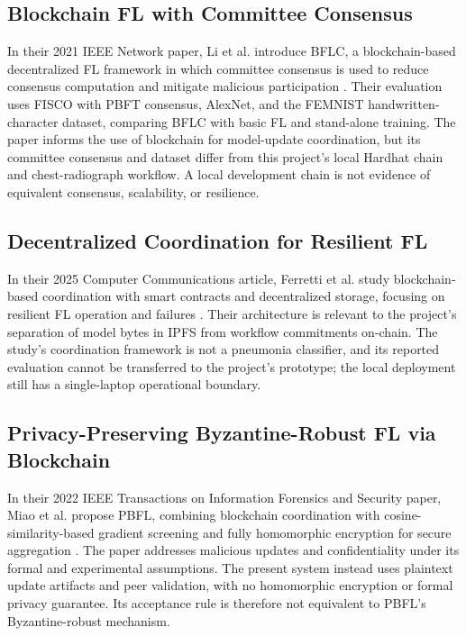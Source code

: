 \documentclass[12pt,a4paper]{report}
\begin{document}
\subsection{Blockchain FL with Committee Consensus}
In their 2021 IEEE Network paper, Li et al. introduce BFLC, a blockchain-based decentralized FL framework in which committee consensus is used to reduce consensus computation and mitigate malicious participation \cite{li2021bflc}. Their evaluation uses FISCO with PBFT consensus, AlexNet, and the FEMNIST handwritten-character dataset, comparing BFLC with basic FL and stand-alone training. The paper informs the use of blockchain for model-update coordination, but its committee consensus and dataset differ from this project's local Hardhat chain and chest-radiograph workflow. A local development chain is not evidence of equivalent consensus, scalability, or resilience.

\subsection{Decentralized Coordination for Resilient FL}
In their 2025 Computer Communications article, Ferretti et al. study blockchain-based coordination with smart contracts and decentralized storage, focusing on resilient FL operation and failures \cite{ferretti2025resilient}. Their architecture is relevant to the project's separation of model bytes in IPFS from workflow commitments on-chain. The study's coordination framework is not a pneumonia classifier, and its reported evaluation cannot be transferred to the project's prototype; the local deployment still has a single-laptop operational boundary.

\subsection{Privacy-Preserving Byzantine-Robust FL via Blockchain}
In their 2022 IEEE Transactions on Information Forensics and Security paper, Miao et al. propose PBFL, combining blockchain coordination with cosine-similarity-based gradient screening and fully homomorphic encryption for secure aggregation \cite{miao2022pbfl}. The paper addresses malicious updates and confidentiality under its formal and experimental assumptions. The present system instead uses plaintext update artifacts and peer validation, with no homomorphic encryption or formal privacy guarantee. Its acceptance rule is therefore not equivalent to PBFL's Byzantine-robust mechanism.
\end{document}
